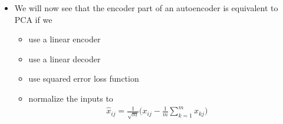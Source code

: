 \begin{frame}
\end{frame}



\begin{frame}
    \begin{columns}
        \begin{overlayarea}{\textwidth}{\textheight}
            
        \end{overlayarea}

        \begin{overlayarea}{\textwidth}{\textheight}
            \begin{itemize}\justifying
                \item We will now see that the encoder part of an autoencoder is equivalent to PCA if we
                \begin{itemize}\justifying
                    \item<2-> use a linear encoder
                    \item<3-> use a linear decoder
                    \item<4-> use squared error loss function
                    \item<5-> normalize the inputs to 
                    \begin{align*}
                         \hat{x}_{ij} = \frac{1}{\sqrt{m}}\Bigg(x_{ij}-\frac{1}{m}\sum\limits_{k=1}^mx_{kj}\Bigg) 
                    \end{align*}
                \end{itemize}
            \end{itemize}
        \end{overlayarea}
    \end{columns}
\end{frame}


